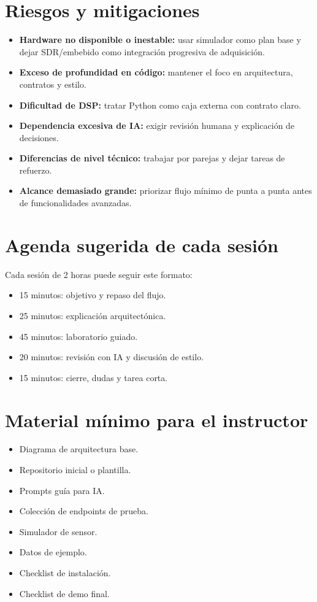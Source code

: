 \documentclass[11pt,a4paper]{article}
\begin{document}
\section*{Riesgos y mitigaciones}

\begin{itemize}
  \item \textbf{Hardware no disponible o inestable:} usar simulador como plan base y dejar SDR/embebido como integración progresiva de adquisición.
  \item \textbf{Exceso de profundidad en código:} mantener el foco en arquitectura, contratos y estilo.
  \item \textbf{Dificultad de DSP:} tratar Python como caja externa con contrato claro.
  \item \textbf{Dependencia excesiva de IA:} exigir revisión humana y explicación de decisiones.
  \item \textbf{Diferencias de nivel técnico:} trabajar por parejas y dejar tareas de refuerzo.
  \item \textbf{Alcance demasiado grande:} priorizar flujo mínimo de punta a punta antes de funcionalidades avanzadas.
\end{itemize}

\section*{Agenda sugerida de cada sesión}

Cada sesión de 2 horas puede seguir este formato:

\begin{itemize}
  \item 15 minutos: objetivo y repaso del flujo.
  \item 25 minutos: explicación arquitectónica.
  \item 45 minutos: laboratorio guiado.
  \item 20 minutos: revisión con IA y discusión de estilo.
  \item 15 minutos: cierre, dudas y tarea corta.
\end{itemize}

\section*{Material mínimo para el instructor}

\begin{itemize}
  \item Diagrama de arquitectura base.
  \item Repositorio inicial o plantilla.
  \item Prompts guía para IA.
  \item Colección de endpoints de prueba.
  \item Simulador de sensor.
  \item Datos de ejemplo.
  \item Checklist de instalación.
  \item Checklist de demo final.
\end{itemize}
\end{document}
